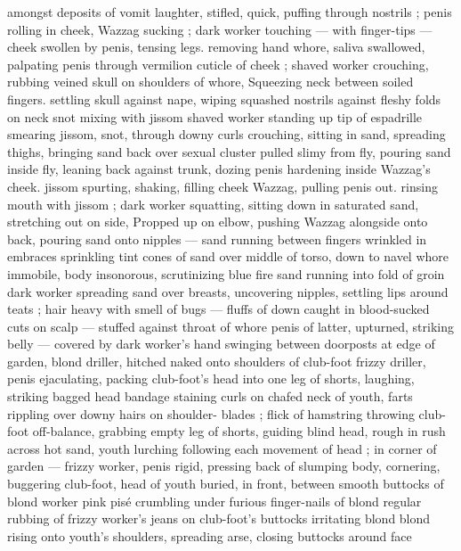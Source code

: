amongst deposits of vomit {\col} laughter, stifled, quick, puffing through 
nostrils ; penis rolling in cheek, Wazzag sucking ; dark worker 
touching --- with finger-tips --- cheek swollen by penis, tensing legs. 
removing hand {\col} whore, saliva swallowed, palpating penis through 
vermilion cuticle of cheek ; shaved worker crouching, rubbing veined 
skull on shoulders of whore, Squeezing neck between soiled fingers. 
settling skull against nape, wiping squashed nostrils against fleshy 
folds on neck {\col} snot mixing with jissom {\col} shaved worker standing up 
tip of espadrille smearing jissom, snot, through downy curls 
crouching, sitting in sand, spreading thighs, bringing sand back over 
sexual cluster pulled slimy from fly, pouring sand inside fly, leaning 
back against trunk, dozing {\col} penis hardening inside Wazzag's cheek. 
jissom spurting, shaking, filling cheek {\col} Wazzag, pulling penis out. 
rinsing mouth with jissom ; dark worker squatting, sitting down in 
saturated sand, stretching out on side, Propped up on elbow, 
pushing Wazzag alongside onto back, pouring sand onto nipples --- 
sand running between fingers wrinkled in embraces {\dashcom} sprinkling 
tint cones of sand over middle of torso, down to navel {\col} whore 
immobile, body insonorous, scrutinizing blue fire {\col} sand running into 
fold of groin {\col} dark worker spreading sand over breasts, uncovering 
nipples, settling lips around teats ; hair heavy with smell of bugs --- 
fluffs of down caught in blood-sucked cuts on scalp --- stuffed 
against throat of whore {\col} penis of latter, upturned, striking belly --- 
covered by dark worker's hand {\col} swinging between doorposts at edge 
of garden, blond driller, hitched naked onto shoulders of club-foot {\col}
frizzy driller, penis ejaculating, packing club-foot's head into one leg 
of shorts, laughing, striking bagged head {\col} bandage staining curls on 
chafed neck of youth, farts rippling over downy hairs on shoulder- 
blades ; flick of hamstring throwing club-foot off-balance, grabbing 
empty leg of shorts, guiding blind head, rough {\col} in rush across hot 
sand, youth lurching following each movement of head ; in corner of 
garden --- frizzy worker, penis rigid, pressing back of slumping 
body, cornering, buggering club-foot, head of youth buried, in front, 
between smooth buttocks of blond worker {\dashcom} pink pis\'{e} crumbling 
under furious finger-nails of blond {\col} regular rubbing of frizzy 
worker's jeans on club-foot's buttocks irritating blond {\col} blond rising 
onto youth's shoulders, spreading arse, closing buttocks around face 
